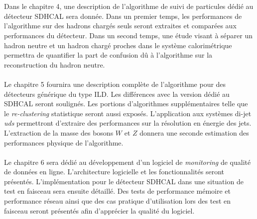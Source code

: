 \\ \\
Dans le chapitre
4,
une description de l'algorithme de suivi de particules dédié au détecteur SDHCAL sera donnée. Dans un premier temps, les performances de l'algorithme sur des hadrons chargés seuls seront extraites et comparées aux performances du détecteur. Dans un second temps, une étude visant à séparer un hadron neutre et un hadron chargé proches dans le système calorimétrique permettra de quantifier la part de confusion dû à l'algorithme sur la reconstruction du hadron neutre.
\\ \\
Le chapitre
5
fournira une description complète de l'algorithme pour des détecteurs générique du type ILD. Les différences avec la version dédié au SDHCAL seront soulignés. Les portions d'algorithmes supplémentaires telle que le \textit{re-clustering} statistique seront aussi exposés. L'application aux systèmes di-jet \textit{uds} permettront d'extraire des performances sur la résolution en énergie des jets. L'extraction de la masse des bosons $W$ et $Z$ donnera une seconde estimation des performances physique de l'algorithme.
\\ \\
Le chapitre
6
sera dédié au développement d'un logiciel de \textit{monitoring} de qualité de données en ligne. L’architecture logicielle et les fonctionnalités seront présentés. L'implémentation pour le détecteur SDHCAL dans une situation de test en faisceau sera ensuite détaillé. Des tests de performance mémoire et performance réseau ainsi que des cas pratique d'utilisation lors des test en faisceau seront présentés afin d'apprécier la qualité du logiciel.
